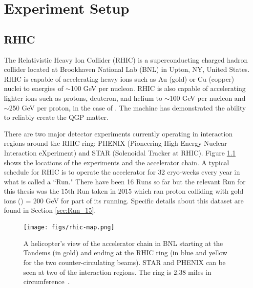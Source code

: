 \chapter{Experiment Setup}
\section{RHIC}
The Relativistic Heavy Ion Collider (RHIC) is a superconducting charged hadron collider located at Brookhaven National Lab (BNL) in Upton, NY, United States. RHIC is capable of accelerating heavy ions such as Au (gold) or Cu (copper) nuclei to energies of $\sim$100 GeV per nucleon. RHIC is also capable of accelerating lighter ions such as protons, deuteron, and helium to $\sim	$100 GeV per nucleon and $\sim$250 GeV per proton, in the case of \pp. The machine has demonstrated the ability to reliably create the QGP matter.

There are two major detector experiments currently operating in interaction regions around the RHIC ring: PHENIX (Pioneering High Energy Nuclear Interaction eXperiment) and STAR (Solenoidal Tracker at RHIC). Figure \ref{fig:rhic_heli_photo} shows the locations of the experiments and the accelerator chain. A typical schedule for RHIC is to operate the accelerator for 32 cryo-weeks every year in what is called a ``Run." There have been 16 Runs so far but the relevant Run for this thesis was the 15th Run taken in 2015 which ran proton colliding with gold ions (\pau) \sqsn = 200 GeV for part of its running. Specific details about this dataset are found in Section \ref{sec:Run_15}.

\begin{figure}[!ht]
\centering
\texttt{[image: figs/rhic-map.png]}
\caption{A helicopter's view of the accelerator chain in BNL starting at the Tandems (in gold) and ending at the RHIC ring (in blue and yellow for the two counter-circulating beams). STAR and PHENIX can be seen at two of the interaction regions. The ring is 2.38 miles in circumference~\cite{Tannenbaum:2013wkn}.}
\label{fig:rhic_heli_photo}
\end{figure}

